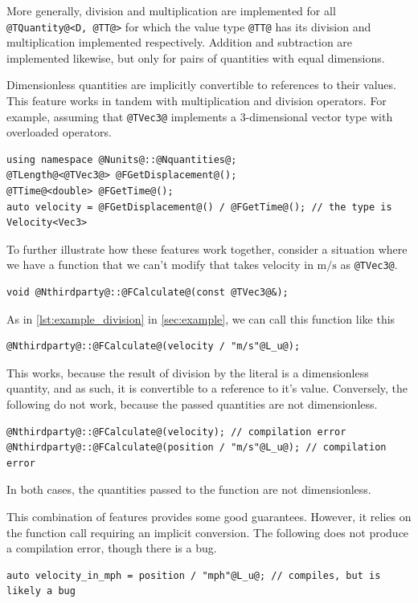 \documentclass[11pt,letterpaper]{article}
\begin{document}
More generally, division and multiplication are implemented for all
\lstinline{@TQuantity@<D, @TT@>} for which the value type \lstinline{@TT@} has
its division and multiplication implemented respectively.
Addition and subtraction are implemented likewise, but only for pairs of
quantities with equal dimensions.

Dimensionless quantities are implicitly convertible to references to their values.
This feature works in tandem with multiplication and division operators.
For example, assuming that \lstinline{@TVec3@} implements a 3-dimensional vector type
with overloaded operators.
%
\begin{lstlisting}
using namespace @Nunits@::@Nquantities@;
@TLength@<@TVec3@> @FGetDisplacement@();
@TTime@<double> @FGetTime@();
auto velocity = @FGetDisplacement@() / @FGetTime@(); // the type is Velocity<Vec3>
\end{lstlisting}

To further illustrate how these features work together,
consider a situation where we have a function that we can't modify that takes velocity
in $\text{m}/\text{s}$ as \lstinline{@TVec3@}.
%
\begin{lstlisting}
void @Nthirdparty@::@FCalculate@(const @TVec3@&);
\end{lstlisting}
%
As in \autoref{lst:example_division} in \autoref{sec:example},
we can call this function like this
%
\begin{lstlisting}
@Nthirdparty@::@FCalculate@(velocity / "m/s"@L_u@);
\end{lstlisting}
%
This works, because the result of division by the literal is a dimensionless quantity,
and as such, it is convertible to a reference to it's value.
Conversely, the following do not work, because the passed quantities are not dimensionless.
%
\begin{lstlisting}
@Nthirdparty@::@FCalculate@(velocity); // compilation error
@Nthirdparty@::@FCalculate@(position / "m/s"@L_u@); // compilation error
\end{lstlisting}
%
In both cases, the quantities passed to the function are not dimensionless.

This combination of features provides some good guarantees. However, it relies on the
function call requiring an implicit conversion.
The following does not produce a compilation error, though there is a bug.
%
\begin{lstlisting}
auto velocity_in_mph = position / "mph"@L_u@; // compiles, but is likely a bug
\end{lstlisting}
\end{document}
